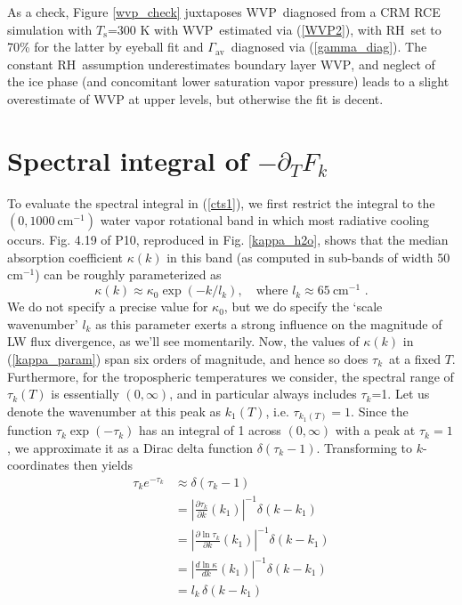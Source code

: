 \documentclass[10pt]{article}
\newcommand{\beqn}{\begin{equation}}
\newcommand{\eeqn}{\end{equation}}
\newcommand{\eqnref}[1]{(\ref{#1})}
\newcommand{\n}{\nonumber}
\newcommand{\inverse}{^{-1}}
\newcommand{\partialderf}[2]{\ensuremath{\frac{\partial #1}{\partial #2}}}
\newcommand{\der}[2]{\ensuremath{\frac{d #1}{d #2}}}
\newcommand{\ppt}{\ensuremath{\partial_T}}
\newcommand{\cminverse}{\ensuremath{\mathrm{cm^{-1}}}}
\newcommand{\pierre}{P10}
\newcommand{\tauk}{\ensuremath{\tau_k}}
\newcommand{\Ts}{\ensuremath{T_\mathrm{s}}}
\newcommand{\RH}{\ensuremath{\mathrm{RH}}}
\newcommand{\WVP}{\ensuremath{\mathrm{WVP}}}
\newcommand{\gammaav}{\ensuremath{\Gamma_\mathrm{av}}}
\begin{document}
 	As a  check, Figure \ref{wvp_check} juxtaposes \WVP\ diagnosed from a CRM RCE simulation with \Ts=300 K with \WVP\ estimated via \eqnref{WVP2}, with \RH\ set to 70\% for the latter by eyeball fit and \gammaav\ diagnosed via \eqnref{gamma_diag}. The constant \RH\ assumption underestimates boundary layer \WVP, and neglect of the ice phase (and concomitant lower saturation vapor pressure) leads to a slight overestimate of WVP at upper levels, but otherwise the fit is decent.

	\section{Spectral integral of $-\ppt F_k$}
	To evaluate the spectral integral in \eqnref{cts1}, we first restrict the integral to the  $(0,1000\ \cminverse)$ water vapor rotational band in which most radiative cooling occurs.  Fig. 4.19 of \pierre, reproduced in Fig. \ref{kappa_h2o}, shows that the median absorption coefficient $\kappa(k)$ in this band (as computed in sub-bands of width 50 \cminverse) can be roughly parameterized as 
		\beqn
			\kappa(k) \approx \kappa_0 \exp(-k/l_k), \quad \mbox{where $l_k \approx 65\ \cminverse$ .}
		\label{kappa_param}
		\eeqn
		We do not specify a precise value for $\kappa_0$, but we do specify the `scale wavenumber' $l_k$ as this parameter exerts a strong influence  on the magnitude of LW flux divergence, as we'll see momentarily. Now, the values of $\kappa(k)$ in \eqnref{kappa_param} span six orders of magnitude, and hence so does \tauk\ at a fixed $T$. Furthermore, for the tropospheric temperatures we consider, the spectral range of $\tauk(T)$ is essentially $(0,\infty)$, and in particular always includes \tauk=1. Let us denote the wavenumber at this peak as $k_1(T)$, i.e.  $\tau_{k_1(T)}=1$.  Since the function $\tauk \exp(-\tauk)$ has an integral of 1 across $(0,\infty)$ with a peak  at $\tauk=1$,  we  approximate it as a Dirac delta function $\delta(\tauk- 1)$. Transforming to $k$-coordinates then yields
       \begin{align}
                \tau_k e^{-\tau_k} & \approx \delta(\tau_k- 1)  \n \\
                                            & = \left|\partialderf{\tau_k}{k}(k_1)\right|\inverse\delta(k-k_1) \n  \\
                                            & =  \left|\partialderf{\ln\tau_k}{k}(k_1)\right|\inverse\delta(k-k_1) \n  \\ 
                                            & =  \left|\der{\ln\kappa}{k}(k_1)\right|\inverse\delta(k-k_1) \n \\
                                            & = l_k\,  \delta(k-k_1) \n \label{delta_approx}
        \end{align}
\end{document}

